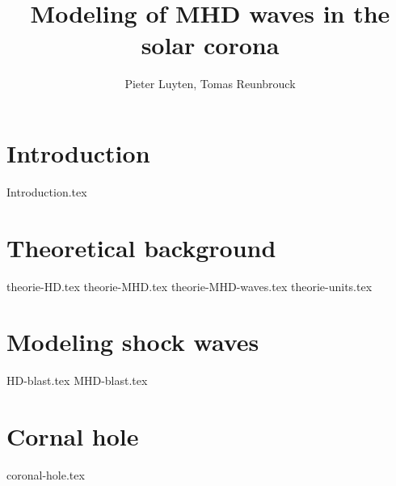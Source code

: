 \documentclass[a4paper]{article}
\title{Modeling of MHD waves in the solar corona}
\author{Pieter Luyten, Tomas Reunbrouck}
\begin{document}
\maketitle
\newpage
\tableofcontents
\newpage

\section{Introduction}
{Introduction.tex}


\section{Theoretical background}
{theorie-HD.tex}
{theorie-MHD.tex}
{theorie-MHD-waves.tex}
{theorie-units.tex}
\newpage

\section{Modeling shock waves}
{HD-blast.tex}
{MHD-blast.tex}
\newpage

\section{Cornal hole}
{coronal-hole.tex}

\newpage

\end{document}
